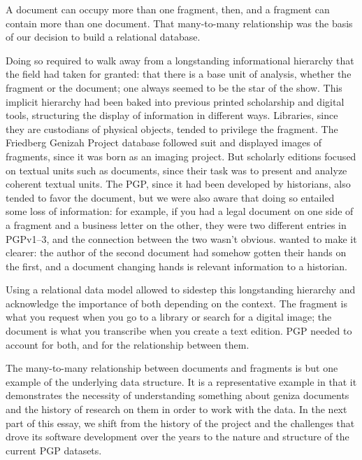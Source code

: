 \documentclass{article}
\begin{document}
A document can occupy more than one fragment, then, and a fragment can contain more than one document. That many-to-many relationship was the basis of our decision to build a relational database. 

Doing so required  to walk away from a longstanding informational hierarchy that the field had taken for granted: that there is a base unit of analysis, whether the fragment or the document; one always seemed to be the star of the show. This implicit hierarchy had been baked into previous printed scholarship and digital tools, structuring the display of information in different ways. Libraries, since they are custodians of physical objects, tended to privilege the fragment. The Friedberg Genizah Project database followed suit and displayed images of fragments, since it was born as an imaging project. But scholarly editions focused on textual units such as documents, since their task was to present and analyze coherent textual units. The PGP, since it had been developed by historians, also tended to favor the document, but we were also aware that doing so entailed some loss of information: for example, if you had a legal document on one side of a fragment and a business letter on the other, they were two different entries in PGPv1–3, and the connection between the two wasn’t obvious.  wanted to make it clearer: the author of the second document had somehow gotten their hands on the first, and a document changing hands is relevant information to a historian. 

Using a relational data model allowed  to sidestep this longstanding hierarchy and acknowledge the importance of both depending on the context. The fragment is what you request when you go to a library or search for a digital image; the document is what you transcribe when you create a text edition. PGP needed to account for both, and for the relationship between them. 


The many-to-many relationship between documents and fragments is but one example of the underlying data structure. It is a representative example in that it demonstrates the necessity of understanding something about geniza documents and the history of research on them in order to work with the data. In the next part of this essay, we shift from the history of the project and the challenges that drove its software development over the years to the nature and structure of the current PGP datasets.
\end{document}
